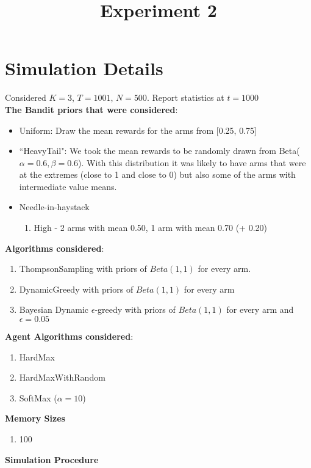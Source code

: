 \documentclass[11pt,letterpaper]{article}
\begin{document}
 

\title{Experiment 2}
\maketitle

\section*{Simulation Details}

Considered $K = 3$, $T = 1001$, $N = 500$. Report statistics at $t = 1000$ \\
\textbf{The Bandit priors that were considered}:
\begin{itemize}
\item Uniform: Draw the mean rewards for the arms from [0.25, 0.75]
\item ``HeavyTail": We took the mean rewards to be randomly drawn from Beta($\alpha=0.6,\beta=0.6$). With this distribution it was likely to have arms that were at the extremes (close to 1 and close to 0) but also some of the arms with intermediate value means.
\item Needle-in-haystack
\begin{enumerate}
\item High - 2 arms with mean 0.50, 1 arm with mean 0.70 (+ 0.20)
\end{enumerate}
\end{itemize}
\textbf{Algorithms considered}:
\begin{enumerate}
\item ThompsonSampling with priors of $Beta(1, 1)$ for every arm.
\item DynamicGreedy with priors of $Beta(1, 1)$ for every arm
\item Bayesian Dynamic $\epsilon$-greedy with priors of $Beta(1, 1)$ for every arm and $\epsilon=0.05$
\end{enumerate}
\textbf{Agent Algorithms considered}:
\begin{enumerate}
\item HardMax
\item HardMaxWithRandom
\item SoftMax ($\alpha = 10$)
\end{enumerate}
\textbf{Memory Sizes}
\begin{enumerate}
\item 100
\end{enumerate}
\pagebreak
\textbf{Simulation Procedure}
\end{document}

